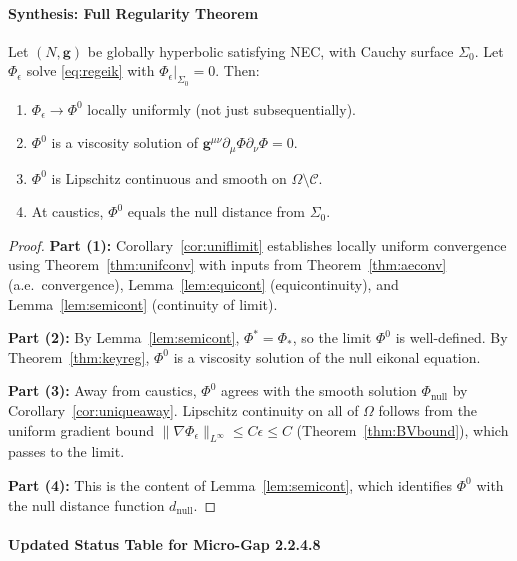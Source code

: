 \paragraph{Synthesis: Full Regularity Theorem}

\begin{theorem}\label{thm:reglimit}
Let $(N, \mathbf{g})$ be globally hyperbolic satisfying NEC, with Cauchy surface $\Sigma_0$. Let $\Phi_\epsilon$ solve \eqref{eq:regeik} with $\Phi_\epsilon|_{\Sigma_0} = 0$. Then:
\begin{enumerate}
    \item $\Phi_\epsilon \to \Phi^0$ locally uniformly (not just subsequentially).
    \item $\Phi^0$ is a viscosity solution of $\mathbf{g}^{\mu\nu}\partial_\mu\Phi\partial_\nu\Phi = 0$.
    \item $\Phi^0$ is Lipschitz continuous and smooth on $\Omega \setminus \mathcal{C}$.
    \item At caustics, $\Phi^0$ equals the null distance from $\Sigma_0$.
\end{enumerate}
\end{theorem}

\begin{proof}
\textbf{Part (1):} Corollary~\ref{cor:uniflimit} establishes locally uniform convergence using Theorem~\ref{thm:unifconv} with inputs from Theorem~\ref{thm:aeconv} (a.e.\ convergence), Lemma~\ref{lem:equicont} (equicontinuity), and Lemma~\ref{lem:semicont} (continuity of limit).

\textbf{Part (2):} By Lemma~\ref{lem:semicont}, $\Phi^* = \Phi_*$, so the limit $\Phi^0$ is well-defined. By Theorem~\ref{thm:keyreg}, $\Phi^0$ is a viscosity solution of the null eikonal equation.

\textbf{Part (3):} Away from caustics, $\Phi^0$ agrees with the smooth solution $\Phi_{\text{null}}$ by Corollary~\ref{cor:uniqueaway}. Lipschitz continuity on all of $\Omega$ follows from the uniform gradient bound $\|\nabla\Phi_\epsilon\|_{L^\infty} \leq C\epsilon \leq C$ (Theorem~\ref{thm:BVbound}), which passes to the limit.

\textbf{Part (4):} This is the content of Lemma~\ref{lem:semicont}, which identifies $\Phi^0$ with the null distance function $d_{\text{null}}$.
\end{proof}

\paragraph{Updated Status Table for Micro-Gap 2.2.4.8}

